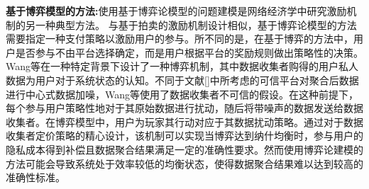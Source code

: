 
\noindent\textbf{基于博弈模型的方法:}使用基于博弈论模型的问题建模\cite{DejunJ, he2017exchange,Yang17}是网络经济学中研究激励机制的另一种典型方法。
与基于拍卖的激励机制设计相似，基于博弈论模型的方法需要指定一种支付策略以激励用户的参与。所不同的是，在基于博弈的方法中，用户是否参与不由平台选择确定，而是用户根据平台的奖励规则做出策略性的决策。
Wang等\cite{wang2016value}在一种特定背景下设计了一种博弈机制，其中数据收集者购得的用户私人数据为用户对于系统状态的认知。不同于文献[]中所考虑的可信平台对聚合后数据进行中心式数据加噪，Wang等\cite{wang2016value}使用了数据收集者不可信的假设。在这种前提下，每个参与用户策略性地对于其原始数据进行扰动，随后将带噪声的数据发送给数据收集者。在博弈模型中，用户为玩家其行动对应于其数据扰动策略。通过对于数据收集者定价策略的精心设计，该机制可以实现当博弈达到纳什均衡时，参与用户的隐私成本得到补偿且数据聚合结果满足一定的准确性要求。然而使用博弈论建模的方法可能会导致系统处于效率较低的均衡状态，使得数据聚合结果难以达到较高的准确性标准。


